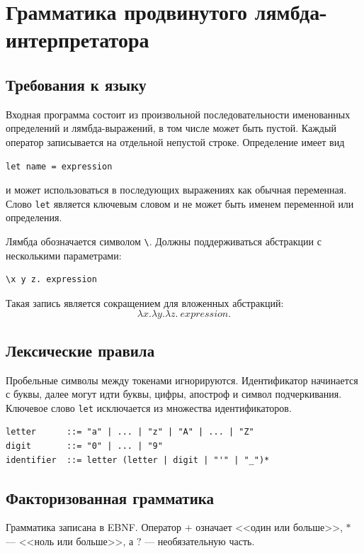 \documentclass[12pt,a4paper]{article}
\begin{document}
\section*{Грамматика продвинутого лямбда-интерпретатора}

\subsection*{Требования к языку}

Входная программа состоит из произвольной последовательности именованных
определений и лямбда-выражений, в том числе может быть пустой. Каждый
оператор записывается на отдельной непустой строке. Определение имеет вид
\begin{verbatim}
let name = expression
\end{verbatim}
и может использоваться в последующих выражениях как обычная переменная.
Слово \verb|let| является ключевым словом и не может быть именем
переменной или определения.

Лямбда обозначается символом \verb|\|. Должны поддерживаться
абстракции с несколькими параметрами:
\begin{verbatim}
\x y z. expression
\end{verbatim}
Такая запись является сокращением для вложенных абстракций:
\[
\lambda x.\lambda y.\lambda z.\ expression.
\]

\subsection*{Лексические правила}

Пробельные символы между токенами игнорируются. Идентификатор начинается
с буквы, далее могут идти буквы, цифры, апостроф и символ подчеркивания.
Ключевое слово \verb|let| исключается из множества идентификаторов.

\begin{verbatim}
letter      ::= "a" | ... | "z" | "A" | ... | "Z"
digit       ::= "0" | ... | "9"
identifier  ::= letter (letter | digit | "'" | "_")*
\end{verbatim}

\subsection*{Факторизованная грамматика}

Грамматика записана в EBNF. Оператор $+$ означает <<один или больше>>,
$*$ --- <<ноль или больше>>, а $?$ --- необязательную часть.
\end{document}
